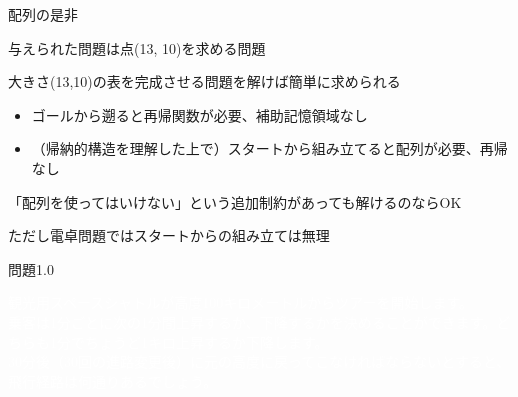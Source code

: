 \documentclass{beamer}
\begin{document}
\begin{frame}[fragile]{配列の是非}{}

与えられた問題は点(13, 10)を求める問題

大きさ(13,10)の表を完成させる問題を解けば簡単に求められる

\vfill
\begin{itemize}\itemsep8pt
\item ゴールから遡ると再帰関数が必要、補助記憶領域なし
\item （帰納的構造を理解した上で）スタートから組み立てると配列が必要、再帰なし
\end{itemize}

\vfill
「配列を使ってはいけない」という追加制約があっても解けるのならOK

\vfill
{\fontsize{5}{5}\selectfont ただし電卓問題ではスタートからの組み立ては無理}
\end{frame}

\begin{frame}[fragile]{問題1.0}{}
\begin{spacing}{1.25}
\textcolor{white}{
観光用スペースシャトルが高度100キロメートルからツアーを開始します。\\
乗客は1分ごとに次の1分間上昇するか、下降するかを決めることができます。どちらも1分でちょうど1キロ上昇するか下降します。\\
30分後（30回の進路変更後）に元の高度に戻ってこなければならないとすると、飛行経路は何通りあるでしょう。
}
\end{spacing}
\end{frame}
\end{document}
